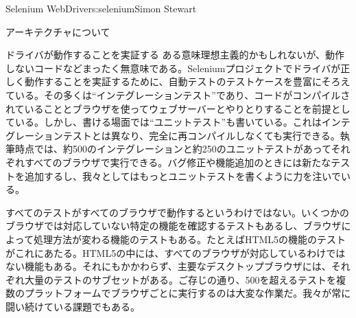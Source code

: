 \begin{aosachapter}{Selenium WebDriver}{s:selenium}{Simon Stewart}
\begin{aosasect1}{アーキテクチャについて}
\begin{aosasect2}{ドライバが動作することを実証する}
ある意味理想主義的かもしれないが、動作しないコードなどまったく無意味である。Seleniumプロジェクトでドライバが正しく動作することを実証するために、自動テストのテストケースを豊富にそろえている。その多くは``インテグレーションテスト''であり、コードがコンパイルされていることとブラウザを使ってウェブサーバーとやりとりすることを前提としている。しかし、書ける場面では``ユニットテスト''も書いている。これはインテグレーションテストとは異なり、完全に再コンパイルしなくても実行できる。執筆時点では、約500のインテグレーションと約250のユニットテストがあってそれぞれすべてのブラウザで実行できる。バグ修正や機能追加のときには新たなテストを追加するし、我々としてはもっとユニットテストを書くように力を注いでいる。

すべてのテストがすべてのブラウザで動作するというわけではない。いくつかのブラウザでは対応していない特定の機能を確認するテストもあるし、ブラウザによって処理方法が変わる機能のテストもある。たとえばHTML5の機能のテストがこれにあたる。HTML5の中には、すべてのブラウザが対応しているわけではない機能もある。それにもかかわらず、主要なデスクトップブラウザには、それぞれ大量のテストのサブセットがある。ご存じの通り、500を超えるテストを複数のプラットフォームでブラウザごとに実行するのは大変な作業だ。我々が常に闘い続けている課題でもある。


\end{aosasect2}
\end{aosasect1}
\end{aosachapter}

